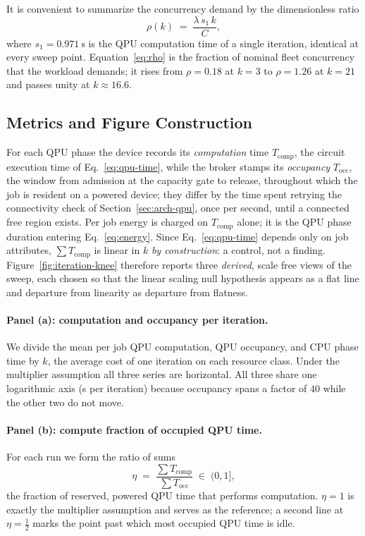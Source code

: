 It is convenient to summarize the concurrency demand by the dimensionless ratio
\begin{equation}
  \rho(k) \;=\; \frac{\lambda \, s_1 \, k}{C},
  \label{eq:rho}
\end{equation}
where $s_1 = \qty{0.971}{\second}$ is the QPU computation time of a single iteration, identical at every sweep point. Equation~\eqref{eq:rho} is the fraction of nominal fleet concurrency that the workload demands; it rises from $\rho = 0.18$ at $k=3$ to $\rho = 1.26$ at $k=21$ and passes unity at $k \approx 16.6$.

\subsection{Metrics and Figure Construction}
\label{sec:iter-metrics}

For each QPU phase the device records its \emph{computation} time $T_{\mathrm{comp}}$, the circuit execution time of Eq.~\eqref{eq:qpu-time}, while the broker stamps its \emph{occupancy} $T_{\mathrm{occ}}$, the window from admission at the capacity gate to release, throughout which the job is resident on a powered device; they differ by the time spent retrying the connectivity check of Section~\ref{sec:arch-qpu}, once per second, until a connected free region exists. Per job energy is charged on $T_{\mathrm{comp}}$ alone; it is the QPU phase duration entering Eq.~\eqref{eq:energy}. Since Eq.~\eqref{eq:qpu-time} depends only on job attributes, $\sum T_{\mathrm{comp}}$ is linear in $k$ \emph{by construction}: a control, not a finding. Figure~\ref{fig:iteration-knee} therefore reports three \emph{derived}, scale free views of the sweep, each chosen so that the linear scaling null hypothesis appears as a flat line and departure from linearity as departure from flatness.

\paragraph{Panel (a): computation and occupancy per iteration.}
We divide the mean per job QPU computation, QPU occupancy, and CPU phase time by $k$, the average cost of one iteration on each resource class. Under the multiplier assumption all three series are horizontal. All three share one logarithmic axis (\unit{\second} per iteration) because occupancy spans a factor of $40$ while the other two do not move.

\paragraph{Panel (b): compute fraction of occupied QPU time.}
For each run we form the ratio of sums
\begingroup
\small
\begin{equation}
  \eta \;=\; \frac{\sum T_{\mathrm{comp}}}{\sum T_{\mathrm{occ}}} \;\in\; (0, 1],
  \label{eq:eta}
\end{equation}
\endgroup
the fraction of reserved, powered QPU time that performs computation. $\eta = 1$ is exactly the multiplier assumption and serves as the reference; a second line at $\eta = \tfrac12$ marks the point past which most occupied QPU time is idle.


